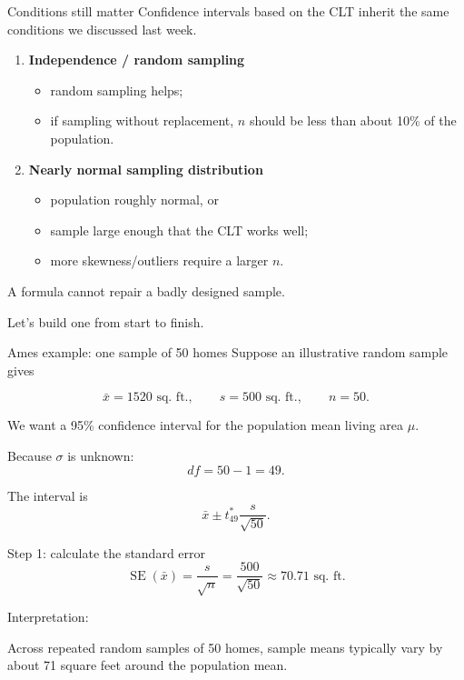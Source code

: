 \documentclass[11pt,aspectratio=169]{beamer}
\newcommand{\SE}{\operatorname{SE}}
\begin{document}
\begin{frame}{Conditions still matter}
Confidence intervals based on the CLT inherit the same conditions we discussed last week.

\begin{enumerate}
  \item \textbf{Independence / random sampling}
  \begin{itemize}
    \item random sampling helps;
    \item if sampling without replacement, $n$ should be less than about 10\% of the population.
  \end{itemize}
  \item \textbf{Nearly normal sampling distribution}
  \begin{itemize}
    \item population roughly normal, or
    \item sample large enough that the CLT works well;
    \item more skewness/outliers require a larger $n$.
  \end{itemize}
\end{enumerate}

\vfill
\alert{A formula cannot repair a badly designed sample.}
\end{frame}

\begin{frame}[standout]
\Large Let's build one from start to finish.
\end{frame}

\begin{frame}{Ames example: one sample of 50 homes}
Suppose an illustrative random sample gives

\[
\bar{x}=1520\text{ sq. ft.},\qquad s=500\text{ sq. ft.},\qquad n=50.
\]

We want a 95\% confidence interval for the population mean living area $\mu$.

\vspace{0.8em}
Because $\sigma$ is unknown:
\[
df=50-1=49.
\]

\vfill
The interval is
\[
\bar{x}\pm t^*_{49}\frac{s}{\sqrt{50}}.
\]
\end{frame}

\begin{frame}{Step 1: calculate the standard error}
\[
\SE(\bar{x})=\frac{s}{\sqrt{n}}
=\frac{500}{\sqrt{50}}
\approx \boxed{70.71\text{ sq. ft.}}
\]

\vspace{0.9em}
Interpretation:

\begin{center}
Across repeated random samples of 50 homes, sample means typically vary by about \alert{71 square feet} around the population mean.
\end{center}
\end{frame}
\end{document}
